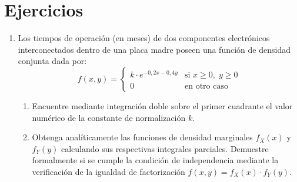 \documentclass[letterpaper,12pt]{article}
\newenvironment{ejercicios}{%
    \section*{Ejercicios}
}{}
\begin{document}
\begin{ejercicios}
\begin{enumerate}[leftmargin=*,itemsep=0.8em]
    \newpage
    \item Los tiempos de operación (en meses) de dos componentes electrónicos interconectados dentro de una placa madre poseen una función de densidad conjunta dada por:
    $$f(x, y) = \begin{cases} k \cdot e^{-0,2x - 0,4y} & \text{si } x \geq 0, \; y \geq 0 \\ 0 & \text{en otro caso} \end{cases}$$
    \begin{enumerate}[label=\alph*)]
        \item Encuentre mediante integración doble sobre el primer cuadrante el valor numérico de la constante de normalización $k$.
        \item Obtenga analíticamente las funciones de densidad marginales $f_X(x)$ y $f_Y(y)$ calculando sus respectivas integrales parciales. Demuestre formalmente si se cumple la condición de independencia mediante la verificación de la igualdad de factorización $f(x,y) = f_X(x) \cdot f_Y(y)$.
    \end{enumerate}

\end{enumerate}
\end{ejercicios}
\end{document}

